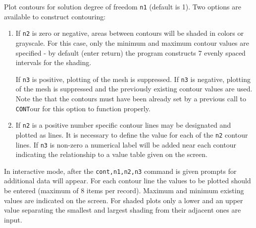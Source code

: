 \headb

Plot contours for solution degree of freedom {\tt n1}
(default is 1).
Two options are available to construct contouring:
\begin{enumerate}
\item{
If {\tt n2} is zero or negative, areas between contours
will be shaded in colors or grayscale.  For this case, only
the minimum and maximum contour values are specified - by
default (enter return) the program constructs 7 evenly
spaced intervals for the shading.

If {\tt n3} is positive, plotting of the mesh is suppressed.
If {\tt n3} is negative, plotting
of the mesh is suppressed and the previously existing
contour values are used.  Note the that the contours must
have been already set by a previous call to {\tt CONT}our for this
option to function properly.}
\item{
If {\tt n2} is a positive number specific contour lines may be designated
and plotted as lines. It is necessary to define the value for each of the
{\tt n2} contour lines.
If {\tt n3} is non-zero a numerical label will
be added near each contour indicating the relationship to a
value table given on the screen.}
\end{enumerate}

In interactive mode, after the {\tt cont,n1,n2,n3} command
is given prompts for additional data will appear.  For each
contour line the values to be plotted should be entered
(maximum of 8 items per record).  Maximum and minimum existing values
are indicated on the screen.
For shaded plots only a lower and an upper value separating the smallest
and largest shading from their adjacent ones are input.
\vfill\eject
